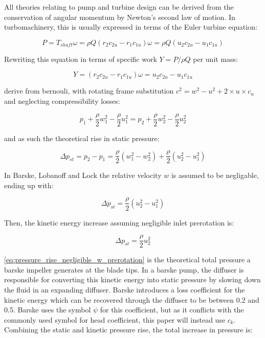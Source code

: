 All theories relating to pump and turbine design can be derived from the conservation of angular momentum by Newton's second law of motion. In turbomachinery, this is usually expressed in terms of the Euler turbine equation:

\begin{equation}
    P=T_{shaft}\omega=\rho Q \left(r_2 c_{2u} - r_1 c_{1u}\right)\omega=\rho Q\left(u_2c_{2u}-u_1c_{1u}\right)
    \label{eq:euler_turbine_equation}
\end{equation}

Rewriting this equation in terms of specific work $Y=P/\rho Q$ per unit mass:

\begin{equation}
    Y = \left(r_2 c_{2u} - r_1 c_{1u}\right)\omega = u_2c_{2u}-u_1c_{1u}
     \label{eq:euler_specific_work}
\end{equation}

derive from bernouli, with rotating frame substitution $c^2=w^2-u^2+2\times u \times c_u$ and neglecting compressibility losses:

$$p_{1}+\frac{\rho}{2}w_{1}^2-\frac{\rho}{2}u_{1}^2=p_{2}+\frac{\rho}{2}w_{2}^2-\frac{\rho}{2}u_{2}^2$$

and as such the theoretical rise in static pressure:

\begin{equation}
    \Delta p_{st} = p_2-p_1 = \frac{\rho}{2}\left(w_1^2-w_2^2\right)+\frac{\rho}{2}\left(u_2^2-u_1^2\right)
    \label{eq:pressure_rise}
\end{equation}

In Barske, Lobanoff and Lock the relative velocity $w$ is assumed to be negligable, ending up with:

\begin{equation}
    \Delta p_{st} = \frac{\rho}{2}\left(u_2^2-u_1^2\right)
    \label{eq:pressure_rise_negligible_w}
\end{equation}

Then, the kinetic energy increase assuming negligible inlet prerotation is:

\begin{equation}
    \Delta p_{st} = \frac{\rho}{2}u_2^2
    \label{eq:pressure_rise_negligible_w_prerotation}
\end{equation}




\cref{eq:pressure_rise_negligible_w_prerotation} is the theoretical total pressure a barske impeller generates at the blade tips. In a barske pump, the diffuser is responsible for converting this kinetic energy into static pressure by slowing down the fluid in an expanding diffuser. Barske introduces a loss coefficient for the kinetic energy which can be recovered through the diffuser to be between 0.2 and 0.5. Barske uses the symbol $\psi$ for this coefficient, but as it conflicts with the commonly used symbol for head coefficient, this paper will instead use $c_k$. Combining the static and kinetic pressure rise, the total increase in pressure is:

